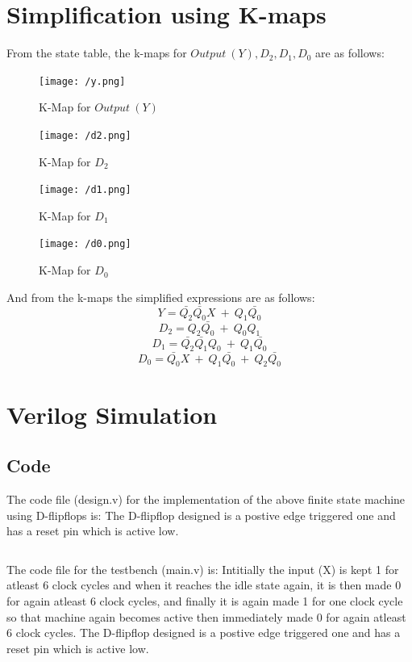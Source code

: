 \documentclass[a4paper]{article}
\begin{document}
\section{Simplification using K-maps}
From the state table, the k-maps for $Output\  (Y),D_{2},D_{1},D_{0}$ are as follows:
\begin{figure}[H]
  \centering
  \begin{minipage}[c]{0.45\textwidth}
      \centering
      \texttt{[image: /y.png]}
      \caption{K-Map for $Output\ (Y)$}
  \end{minipage}
  \begin{minipage}[c]{0.45\textwidth}
      \centering
      \texttt{[image: /d2.png]}
      \caption{K-Map for $D_{2}$}
  \end{minipage}
\end{figure}
\begin{figure}[H]
  \centering
  \begin{minipage}[c]{0.45\textwidth}
    \centering
    \texttt{[image: /d1.png]}
    \caption{K-Map for $D_{1}$}
\end{minipage}
  \begin{minipage}[c]{0.45\textwidth}
      \centering
      \texttt{[image: /d0.png]}
      \caption{K-Map for $D_{0}$}
  \end{minipage}
\end{figure}
And from the k-maps the simplified expressions are as follows:
$$ Y = \bar{Q_{2}}\bar{Q_{0}}X \ +\  Q_{1}\bar{Q_{0}}$$
$$ D_{2} = Q_{2}\bar{Q_{0}}\ +\ Q_{0}Q_{1}$$
$$ D_{1} = \bar{Q_{2}}\bar{Q_{1}}Q_{0}\ +\ Q_{1}\bar{Q_{0}}$$
$$ D_{0} = \bar{Q_{0}}X\ +\ Q_{1}\bar{Q_{0}}\ +\ Q_{2}\bar{Q_{0}}$$
\section{Verilog Simulation}
\subsection{Code}
The code file (design.v) for the implementation of the above finite state machine using D-flipflops is:
The D-flipflop designed is a postive edge triggered one and has a reset pin which is active low.
\inputminted[bgcolor=bg,frame=lines,framesep=2mm,numbers=left]
{Verilog}{./code-files/design.v}

The code file for the testbench (main.v) is:
Intitially the input (X) is kept 1 for atleast 6 clock cycles and when it reaches the idle state again, it is then made 0 for again atleast 6 clock cycles, and finally it is again made 1 for one clock cycle so that machine again becomes active then immediately made 0 for again atleast 6 clock cycles.
The D-flipflop designed is a postive edge triggered one and has a reset pin which is active low.
\inputminted[bgcolor=bg,frame=lines,framesep=2mm,numbers=left]
{Verilog}{./code-files/main.v}
\end{document}
